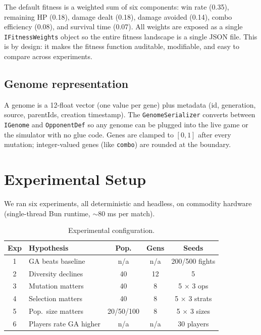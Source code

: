 \documentclass[conference]{IEEEtran}
\begin{document}
The default fitness is a weighted sum of six components: win rate (0.35), remaining HP (0.18), damage dealt (0.18), damage avoided (0.14), combo efficiency (0.08), and survival time (0.07). All weights are exposed as a single \texttt{IFitnessWeights} object so the entire fitness landscape is a single JSON file. This is by design: it makes the fitness function auditable, modifiable, and easy to compare across experiments.

\subsection{Genome representation}

A genome is a 12-float vector (one value per gene) plus metadata (id, generation, source, parentIds, creation timestamp). The \texttt{GenomeSerializer} converts between \texttt{IGenome} and \texttt{OpponentDef} so any genome can be plugged into the live game or the simulator with no glue code. Genes are clamped to $[0, 1]$ after every mutation; integer-valued genes (like \texttt{combo}) are rounded at the boundary.

\section{Experimental Setup}
\label{sec:exp-setup}

We ran six experiments, all deterministic and headless, on commodity hardware (single-thread Bun runtime, $\sim$80 ms per match).

\begin{table}[!t]
\centering
\caption{Experimental configuration.}
\label{tab:exp-config}
\begin{tabular}{clccc}
\toprule
\textbf{Exp} & \textbf{Hypothesis} & \textbf{Pop.} & \textbf{Gens} & \textbf{Seeds} \\
\midrule
1 & GA beats baseline & n/a & n/a & 200/500 fights \\
2 & Diversity declines & 40 & 12 & 5 \\
3 & Mutation matters & 40 & 8 & 5 $\times$ 3 ops \\
4 & Selection matters & 40 & 8 & 5 $\times$ 3 strats \\
5 & Pop.\ size matters & 20/50/100 & 8 & 5 $\times$ 3 sizes \\
6 & Players rate GA higher & n/a & n/a & 30 players \\
\bottomrule
\end{tabular}
\end{table}
\end{document}
